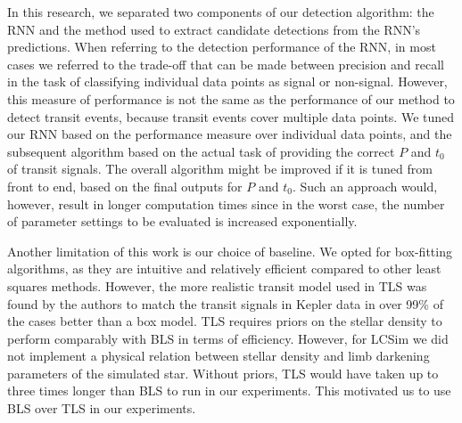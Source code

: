 In this research, we separated two components of our detection algorithm: the RNN and the method used to extract candidate detections from the RNN's predictions. When referring to the detection performance of the RNN, in most cases we referred to the trade-off that can be made between precision and recall in the task of classifying individual data points as signal or non-signal. However, this measure of performance is not the same as the performance of our method to detect transit events, because transit events cover multiple data points. We tuned our RNN based on the performance measure over individual data points, and the subsequent algorithm based on the actual task of providing the correct $P$ and $t_0$ of transit signals. The overall algorithm might be improved if it is tuned from front to end, based on the final outputs for $P$ and $t_0$. Such an approach would, however, result in longer computation times since in the worst case, the number of parameter settings to be evaluated is increased exponentially.

Another limitation of this work is our choice of baseline. We opted for box-fitting algorithms, as they are intuitive and relatively efficient compared to other least squares methods. However, the more realistic transit model used in TLS \citep{hippke2019optimized} was found by the authors to match the transit signals in Kepler data in over 99\% of the cases better than a box model. TLS requires priors on the stellar density to perform comparably with BLS in terms of efficiency. However, for LCSim we did not implement a physical relation between stellar density and limb darkening parameters of the simulated star. Without priors, TLS would have taken up to three times longer than BLS to run in our experiments. This motivated us to use BLS over TLS in our experiments. 

